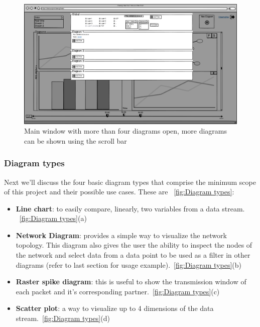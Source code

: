 \documentclass[twoside, english, final]{Pflichtenheft}
\begin{document}
\begin{figure}[h]
	\centering
	\includegraphics[width=\textwidth]{Images/09MW.png}
	\caption{Main window with more than four diagrams open, more diagrams can be shown using the scroll bar}
	\label{fig:mainWindow6}
\end{figure}
\clearpage

\subsubsection{Diagram types}
Next we'll discuss the four basic diagram types that comprise the minimum scope of this project and their possible use cases.
These are ~\autoref{fig:Diagram types}:

\begin{itemize}
	\item[] \textbf{Line chart}: to easily compare, linearly, two variables from a data stream.
~\autoref{fig:Diagram types}(a)
	\item[]\textbf{Network Diagram}: provides a simple way to visualize the network topology. This diagram also gives the user the ability to inspect the nodes of the network and select data from a data point to be used as a filter in other diagrams (refer to last section for usage example).~\autoref{fig:Diagram types}(b)
	\item[]\textbf{Raster spike diagram}: this is useful to show the transmission window of each packet and it's corresponding partner.~\autoref{fig:Diagram types}(c)
	\item[]\textbf{Scatter plot}: a way to visualize up to 4 dimensions of the data stream.~\autoref{fig:Diagram types}(d)
\end{itemize}
\end{document}
